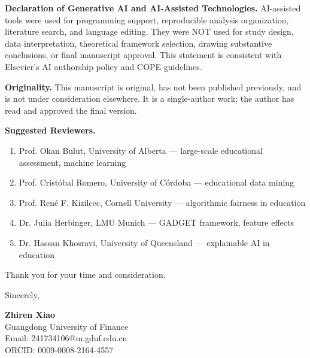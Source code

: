 \documentclass[12pt]{article}
\begin{document}
\textbf{Declaration of Generative AI and AI-Assisted Technologies.} AI-assisted tools were used for programming support, reproducible analysis organization, literature search, and language editing. They were NOT used for study design, data interpretation, theoretical framework selection, drawing substantive conclusions, or final manuscript approval. This statement is consistent with Elsevier's AI authorship policy and COPE guidelines.

\textbf{Originality.} This manuscript is original, has not been published previously, and is not under consideration elsewhere. It is a single-author work; the author has read and approved the final version.

\textbf{Suggested Reviewers.}
\begin{enumerate}
\item Prof. Okan Bulut, University of Alberta --- large-scale educational assessment, machine learning
\item Prof. Crist\'{o}bal Romero, University of C\'{o}rdoba --- educational data mining
\item Prof. Ren\'{e} F. Kizilcec, Cornell University --- algorithmic fairness in education
\item Dr. Julia Herbinger, LMU Munich --- GADGET framework, feature effects
\item Dr. Hassan Khosravi, University of Queensland --- explainable AI in education
\end{enumerate}

\vspace{12pt}
Thank you for your time and consideration.

\vspace{18pt}

Sincerely,

\vspace{12pt}

\textbf{Zhiren Xiao} \\
Guangdong University of Finance \\
Email: 241734106@m.gduf.edu.cn \\
ORCID: 0009-0008-2164-4557
\end{document}
